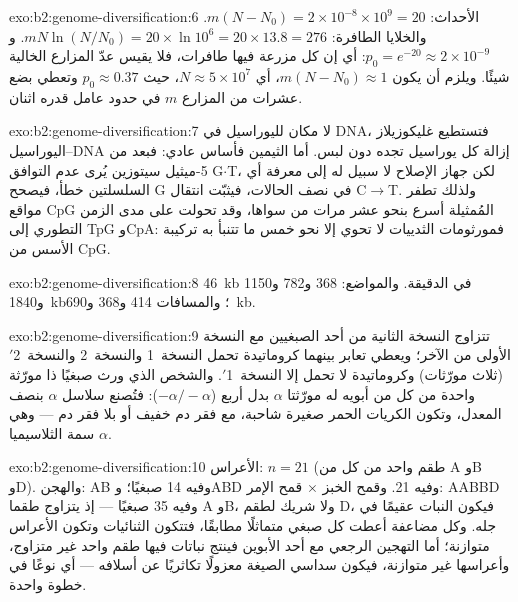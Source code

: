 \begin{solution}{exo:b2:genome-diversification:6}
الأحداث: $m(N - N_0) = 2\times 10^{-8}\times 10^{9} = 20$. والخلايا
الطافرة: $mN\ln(N/N_0) = 20\times \ln 10^{6} = 20\times 13.8 = 276$.
و$p_0 = e^{-20} \approx 2\times 10^{-9}$: أي إن كل مزرعة فيها
طافرات، فلا يقيس عدّ المزارع الخالية شيئًا. ويلزم أن يكون $m(N -
N_0) \approx 1$، أي $N \approx 5\times 10^{7}$، حيث $p_0 \approx
0.37$ وتعطي بضع عشرات من المزارع $m$ في حدود عامل قدره اثنان.
\end{solution}

\begin{solution}{exo:b2:genome-diversification:7}
لا مكان لليوراسيل في DNA، فتستطيع غليكوزيلاز اليوراسيل--DNA إزالة
كل يوراسيل تجده دون لبس. أما الثيمين فأساس عادي: فبعد  من
5-ميثيل سيتوزين يُرى عدم التوافق G$\cdot$T، لكن جهاز الإصلاح لا
سبيل له إلى معرفة أي السلسلتين خطأ، فيصحح G في نصف الحالات، فيثبّت
انتقال C$\to$T. ولذلك تطفر مواقع CpG المُمثيلة أسرع بنحو عشر مرات
من سواها، وقد تحولت على مدى الزمن التطوري إلى TpG وCpA: فمورثومات
الثدييات لا تحوي إلا نحو خمس ما تتنبأ به تركيبة الأسس من CpG.
\end{solution}

\begin{solution}{exo:b2:genome-diversification:8}
\qty{46}{kb} في الدقيقة. والمواضع: 368 و782 و1150
و\qty{1840}{kb}؛ والمسافات 414 و368 و\qty{690}{kb}.
\end{solution}

\begin{solution}{exo:b2:genome-diversification:9}
تتزاوج النسخة الثانية من أحد الصبغيين مع النسخة الأولى من الآخر؛
ويعطي تعابر بينهما كروماتيدة تحمل النسخة~1 والنسخة~2 والنسخة~2$'$
(ثلاث مورّثات) وكروماتيدة لا تحمل إلا النسخة~1$'$. والشخص الذي ورث
صبغيًا ذا مورّثة واحدة من كل من أبويه له مورّثتا $\alpha$ بدل أربع
($-\alpha/-\alpha$): فتُصنع سلاسل $\alpha$ بنصف المعدل، وتكون
الكريات الحمر صغيرة شاحبة، مع فقر دم خفيف أو بلا فقر دم --- وهي
سمة الثلاسيميا $\alpha$.
\end{solution}

\begin{solution}{exo:b2:genome-diversification:10}
الأعراس: $n = 21$ (طقم واحد من كل من A وB وD). والهجن: AB وفيه 14
صبغيًا؛ وABD وفيه 21. وقمح الخبز $\times$ قمح الإمر: AABBD وفيه 35
صبغيًا --- إذ يتزاوج طقما A وB، ولا شريك لطقم D، فيكون النبات عقيمًا
في جله. وكل مضاعفة أعطت كل صبغي متماثلًا مطابقًا، فتتكون الثنائيات
وتكون الأعراس متوازنة؛ أما التهجين الرجعي مع أحد الأبوين فينتج
نباتات فيها طقم واحد غير متزاوج، وأعراسها غير متوازنة، فيكون سداسي
الصيغة معزولًا تكاثريًا عن أسلافه --- أي نوعًا في خطوة واحدة.
\end{solution}

